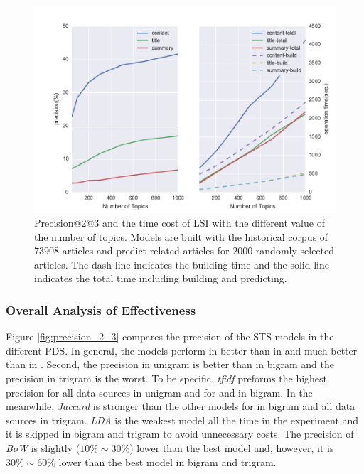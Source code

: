 \begin{figure}[!htb]
    \centering
    \includegraphics[width=\textwidth]{fig/precision_topics}
    \caption{Precision@2@3 and the time cost of LSI with the different value of the number of topics. Models are built with the historical corpus of $73908$ articles and predict related articles for $2000$ randomly selected articles. The dash line indicates the building time and the solid line indicates the total time including building and predicting. }
    \label{fig:precision_topics}
\end{figure}


\subsubsection{Overall Analysis of Effectiveness}

Figure \ref{fig:precision_2_3} compares the precision of the STS models in the different PDS. In general, the models perform in \icontent{} better than in \ititle{} and much better than in \isummary{}. Second, the precision in unigram is better than in bigram and the precision in trigram is the worst. To be specific, \textit{tfidf} preforms the highest precision for all data sources in unigram and for \icontent{} and \ititle{} in bigram. In the meanwhile, \textit{Jaccard} is stronger than the other models for \isummary{} in bigram and all data sources in trigram. \textit{LDA} is the weakest model all the time in the experiment and it is skipped in bigram and trigram to avoid unnecessary costs. The precision of \textit{BoW} is slightly ($10\% \sim 30\%$) lower than the best model and, however, it is $30\% \sim 60\%$ lower than the best model in bigram and trigram. 


